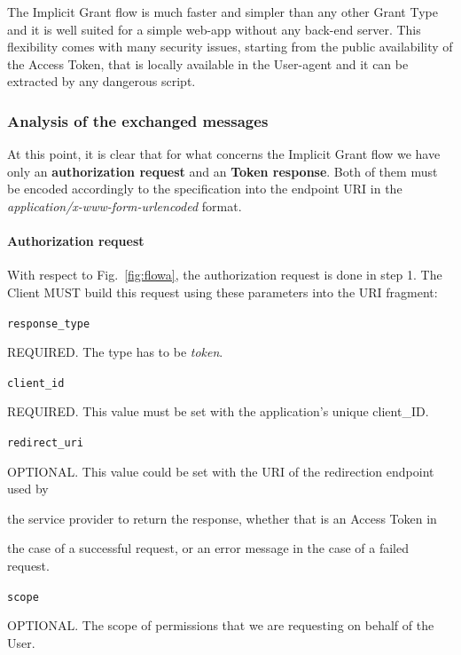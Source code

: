 \documentclass[a4paper,12pt]{article}
\def\myfig#1{Fig.~#1\xspace}
\begin{document}
The Implicit Grant flow is much faster and simpler than any other Grant Type and it is well suited for a simple web-app without any back-end server. This flexibility comes with many security issues, starting from the public availability of the Access Token, that is locally available in the User-agent and it can be extracted by any dangerous script.

\subsubsection{Analysis of the exchanged messages}
At this point, it is clear that for what concerns the Implicit Grant flow we have only an \textbf{authorization request} and an \textbf{Token response}. Both of them must be encoded accordingly to the specification into the endpoint URI in the \textit{application/x-www-form-urlencoded} format.

\paragraph{Authorization request}
\label{authreq}
With respect to \myfig{\ref{fig:flowa}}, the authorization request is done in step 1.
The Client MUST build this request using these parameters into the URI fragment:

\texttt{response\_type}

\hspace{0.5cm}REQUIRED. The type has to be \textit{token}.

\texttt{client\_id}

\hspace{0.5cm}REQUIRED. This value must be set with the application's unique client\_ID.

\texttt{redirect\_uri}

\hspace{0.5cm}OPTIONAL. This value could be set with the URI of the redirection endpoint used by 

\hspace{0.5cm}the service provider to return the response, whether that is an Access Token in 

\hspace{0.5cm}the case of a successful request, or an error message in the case of a failed request.

\texttt{scope}

\hspace{0.5cm}OPTIONAL. The scope of permissions that we are requesting on behalf of the User.
\end{document}

